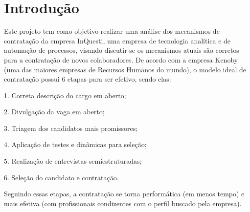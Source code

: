 
\chapter[Introdução]{Introdução}
Este projeto tem como objetivo realizar uma análise dos mecanismos de contratação da empresa InQuesti,
 uma empresa de tecnologia analítica e de automação de processos, visando discutir se os mecanismos atuais
 são corretos para a contratação de novos colaboradores.
De acordo com a empresa  
Kenoby 
(uma das maiores empresas de Recursos Humanos do mundo), o modelo ideal de contratação possui 6 etapas para ser efetivo, sendo elas:

1. Correta descrição do cargo em aberto;

2. Divulgação da vaga em aberto;

3. Triagem dos candidatos mais promissores;

4. Aplicação de testes e dinâmicas para seleção;

5. Realização de entrevistas semiestruturadas;

6. Seleção do candidato e contratação.

Seguindo essas etapas, a contratação se torna performática (em menos tempo) e mais efetiva (com profissionais condizentes com o perfil buscado pela empresa).